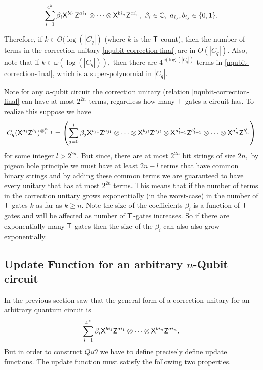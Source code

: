 \begin{equation}
\label{nqubit-correction-final}
\sum_{i=1}^{4^k} \beta_i {\sf X}^{b{i_1}} {\sf Z}^{a{i_1}}\otimes \cdots \otimes {\sf X}^{b{i_n}} {\sf Z}^{a{i_n}},\; \beta_i\in\mathbb{C},\; a_{i_j},b_{i_j}\in\{0,1\}.
\end{equation}

Therefore, if $k\in O(\log(|C_q|)$ (where $k$ is the ${\sf T}$-count), then the number of terms in the correction unitary \ref{nqubit-correction-final} are in $O(|C_q|).$ Also, note that if $k\in \omega(\log(|C_q|)),$ then there are $4^{\omega(\log(|C_q|)}$  terms in \ref{nqubit-correction-final}, which is a super-polynomial in $|C_q|.$ 




\begin{remark}
\label{remark:nqubit-correction2}
Note for any $n$-qubit circuit the correction unitary (relation \ref{nqubit-correction-final} can have at most $2^{2n}$ terms, regardless how many ${\sf T}$-gates a circuit has. To realize this suppose we have 
$$C_q ({\sf X}^{a_{i}}{\sf Z}^{b_{i}})^{\otimes_{i=1}^{n}}=\left(\sum_{j=0}^{l} \beta_j {\sf X}^{b_{j1}}{\sf Z}^{a_{j1}} \otimes \cdots \otimes{\sf X}^{b_{jl}}{\sf Z}^{a_{jl}} \otimes {\sf X}^{a_{l+1}^\prime}{\sf Z}^{b_{l+1}^\prime}  \otimes \cdots   \otimes{\sf X}^{a_{n}^\prime}{\sf Z}^{b_{n}^\prime}\right)$$
for some integer $l>2^{2n}.$
But since, there are at most $2^{2n}$ bit strings of size $2n,$ by pigeon hole principle we must have at least $2n-l$ terms that have common binary strings and by adding these common terms we are guaranteed to have every unitary that has at most $2^{2n}$ terms. This means that if the number of terms in the correction unitary grows exponentially (in the worst-case) in the number of ${\sf T}$-gates $k$ as far as $k\geq n.$ Note the size of the coefficients $\beta_i$ is a function of ${\sf T}$-gates and will be affected as number of ${\sf T}$-gates increases. So if there are exponentially many ${\sf T}$-gates then the size of the $\beta_i$ can also also grow exponentially. 
\end{remark}


\subsection{Update Function for an arbitrary $n$-Qubit circuit}
\label{nqubit:update-function}
In the previous section saw that the general form of a correction unitary for an arbitrary quantum circuit is $$\sum_{i=1}^{4^k} \beta_i {\sf X}^{b{i_1}} {\sf Z}^{a{i_1}}\otimes \cdots \otimes {\sf X}^{b{i_n}} {\sf Z}^{a{i_n}}.$$ But in order to construct $Qi\mathcal{O}$ we have to define precisely define update functions. The update function must satisfy the following two properties.

